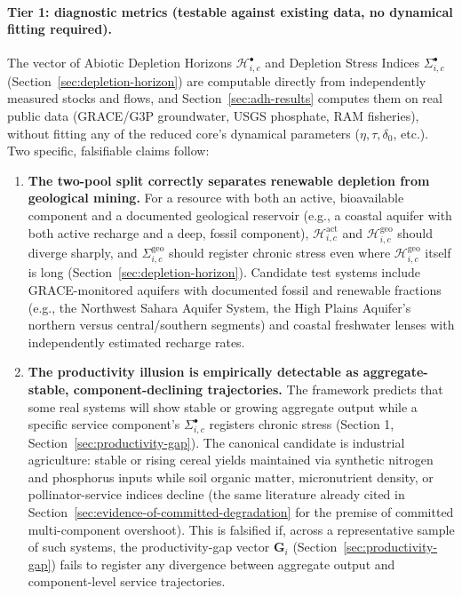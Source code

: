 \documentclass[twocolumn,10pt]{article}
\begin{document}
\paragraph{Tier 1: diagnostic metrics (testable against existing data, no dynamical fitting required).} The vector of Abiotic Depletion Horizons $\mathcal H^{\bullet}_{i,c}$ and Depletion Stress Indices $\Sigma^{\bullet}_{i,c}$ (Section~\ref{sec:depletion-horizon}) are computable directly from independently measured stocks and flows, and Section~\ref{sec:adh-results} computes them on real public data (GRACE/G3P groundwater, USGS phosphate, RAM fisheries), without fitting any of the reduced core's dynamical parameters ($\eta,\tau,\delta_0$, etc.). Two specific, falsifiable claims follow:
\begin{enumerate}
\item \textbf{The two-pool split correctly separates renewable depletion from geological mining.} For a resource with both an active, bioavailable component and a documented geological reservoir (e.g., a coastal aquifer with both active recharge and a deep, fossil component), $\mathcal H^{\text{act}}_{i,c}$ and $\mathcal H^{\text{geo}}_{i,c}$ should diverge sharply, and $\Sigma^{\text{geo}}_{i,c}$ should register chronic stress even where $\mathcal H^{\text{geo}}_{i,c}$ itself is long (Section~\ref{sec:depletion-horizon}). Candidate test systems include GRACE-monitored aquifers with documented fossil and renewable fractions (e.g., the Northwest Sahara Aquifer System, the High Plains Aquifer's northern versus central/southern segments) and coastal freshwater lenses with independently estimated recharge rates.
\item \textbf{The productivity illusion is empirically detectable as aggregate-stable, component-declining trajectories.} The framework predicts that some real systems will show stable or growing aggregate output while a specific service component's $\Sigma^{\bullet}_{i,c}$ registers chronic stress (Section 1, Section~\ref{sec:productivity-gap}). The canonical candidate is industrial agriculture: stable or rising cereal yields maintained via synthetic nitrogen and phosphorus inputs while soil organic matter, micronutrient density, or pollinator-service indices decline (the same literature already cited in Section~\ref{sec:evidence-of-committed-degradation} for the premise of committed multi-component overshoot). This is falsified if, across a representative sample of such systems, the productivity-gap vector $\mathbf G_i$ (Section~\ref{sec:productivity-gap}) fails to register any divergence between aggregate output and component-level service trajectories.
\end{enumerate}
\end{document}
